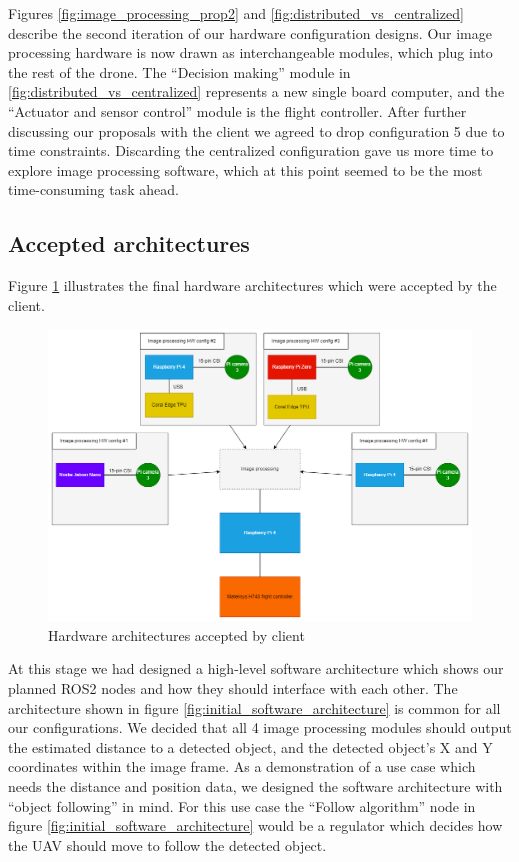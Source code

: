Figures \ref{fig:image_processing_prop2} and \ref{fig:distributed_vs_centralized} describe the second iteration of our hardware configuration designs. Our image processing hardware is now drawn as interchangeable modules, which plug into the rest of the drone. The “Decision making” module in \ref{fig:distributed_vs_centralized} represents a new single board computer, and the “Actuator and sensor control” module is the flight controller.
After further discussing our proposals with the client we agreed to drop configuration 5 due to time constraints. Discarding the centralized configuration gave us more time to explore image processing software, which at this point seemed to be the most time-consuming task ahead.\\

\subsection{Accepted architectures}
\label{sub:accepted_architectures}

Figure \ref{fig:accepted_hw_architectures} illustrates the final hardware architectures which were accepted by the client.

\begin{figure}[H]
    \centering
    \includegraphics[scale=0.45]{a_martinbilder/accepted_hw_architecture.png}
    \caption{Hardware architectures accepted by client}
    \label{fig:accepted_hw_architectures}
\end{figure}


At this stage we had designed a high-level software architecture which shows our planned ROS2 nodes and how they should interface with each other. The architecture shown in figure \ref{fig:initial_software_architecture} is common for all our configurations. We decided that all 4 image processing modules should output the estimated distance to a detected object, and the detected object’s X and Y coordinates within the image frame. As a demonstration of a use case which needs the distance and position data, we designed the software architecture with “object following” in mind. For this use case the “Follow algorithm” node in figure \ref{fig:initial_software_architecture} would be a regulator which decides how the UAV should move to follow the detected object.

